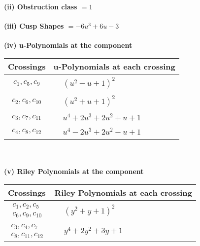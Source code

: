 \documentclass[1p]{elsarticle_modified}
\theoremstyle{definition}
\begin{document}
\flushleft \textbf{(ii) Obstruction class $= 1$}\\~\\
\flushleft \textbf{(iii) Cusp Shapes $= -6 u^3+6 u-3$}\\~\\
\newpage\renewcommand{\arraystretch}{1}
\flushleft \textbf{(iv) u-Polynomials at the component}\newline \\
\begin{tabular}{m{50pt}|m{274pt}}
Crossings & \hspace{64pt}u-Polynomials at each crossing \\
\hline $$\begin{aligned}c_{1},c_{5},c_{9}\end{aligned}$$&$\begin{aligned}
&(u^2- u+1)^2
\end{aligned}$\\
\hline $$\begin{aligned}c_{2},c_{6},c_{10}\end{aligned}$$&$\begin{aligned}
&(u^2+u+1)^2
\end{aligned}$\\
\hline $$\begin{aligned}c_{3},c_{7},c_{11}\end{aligned}$$&$\begin{aligned}
&u^4+2 u^3+2 u^2+u+1
\end{aligned}$\\
\hline $$\begin{aligned}c_{4},c_{8},c_{12}\end{aligned}$$&$\begin{aligned}
&u^4-2 u^3+2 u^2- u+1
\end{aligned}$\\
\hline
\end{tabular}\\~\\
\newpage\renewcommand{\arraystretch}{1}
\flushleft \textbf{(v) Riley Polynomials at the component}\newline \\
\begin{tabular}{m{50pt}|m{274pt}}
Crossings & \hspace{64pt}Riley Polynomials at each crossing \\
\hline $$\begin{aligned}c_{1},c_{2},c_{5}\\c_{6},c_{9},c_{10}\end{aligned}$$&$\begin{aligned}
&(y^2+y+1)^2
\end{aligned}$\\
\hline $$\begin{aligned}c_{3},c_{4},c_{7}\\c_{8},c_{11},c_{12}\end{aligned}$$&$\begin{aligned}
&y^4+2 y^2+3 y+1
\end{aligned}$\\
\hline
\end{tabular}\\~\\
\end{document}
